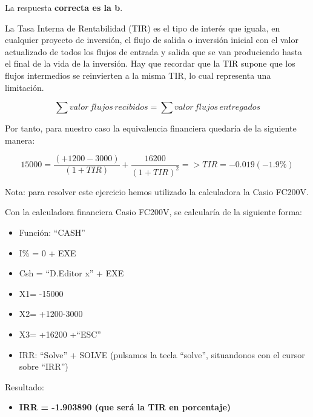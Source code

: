 \documentclass[
  letterpaper,
  DIV=11,
  numbers=noendperiod]{scrreprt}
\providecommand{\tightlist}{%
  \setlength{\itemsep}{0pt}\setlength{\parskip}{0pt}}\usepackage{longtable,booktabs,array}
\begin{document}
\begin{tcolorbox}[enhanced jigsaw, left=2mm, opacityback=0, colback=white, breakable, arc=.35mm, bottomrule=.15mm, rightrule=.15mm, toprule=.15mm, leftrule=.75mm, colframe=quarto-callout-tip-color-frame]
\begin{minipage}[t]{5.5mm}
\textcolor{quarto-callout-tip-color}{\faLightbulb}
\end{minipage}%
\begin{minipage}[t]{\textwidth - 5.5mm}

La respuesta \textbf{correcta es la b}.

La Tasa Interna de Rentabilidad (TIR) es el tipo de interés que iguala,
en cualquier proyecto de inversión, el flujo de salida o inversión
inicial con el valor actualizado de todos los flujos de entrada y salida
que se van produciendo hasta el final de la vida de la inversión. Hay
que recordar que la TIR supone que los flujos intermedios se reinvierten
a la misma TIR, lo cual representa una limitación.

\[\sum valor\,flujos\,recibidos=\sum valor\,flujos\,entregados\]

Por tanto, para nuestro caso la equivalencia financiera quedaría de la
siguiente manera:

\[15000=\frac{\left(+1200-3000\right)}{\left(1+TIR\right)}+\frac{16200}{\left(1+TIR\right)^2}=>TIR=-0.019(-1.9\%)\]

Nota: para resolver este ejercicio hemos utilizado la calculadora la
Casio FC200V.

Con la calculadora financiera Casio FC200V, se calcularía de la
siguiente forma:

\begin{itemize}
\item
  Función: ``CASH''
\item
  I\% = 0 + EXE
\item
  Csh = ``D.Editor x'' + EXE
\item
  X1= -15000
\item
  X2= +1200-3000
\item
  X3= +16200 +``ESC''
\item
  IRR: ``Solve'' + SOLVE (pulsamos la tecla ``solve'', situandonos con
  el cursor sobre ``IRR'')
\end{itemize}

Resultado:

\begin{itemize}
\tightlist
\item
  \textbf{IRR = -1.903890 (que será la TIR en porcentaje)}
\end{itemize}

\end{minipage}%
\end{tcolorbox}
\end{document}
